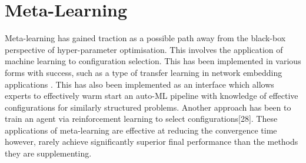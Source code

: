 \documentclass{article}
\begin{document}



    



\section{Meta-Learning}

	Meta-learning has gained traction as a possible path away from the black-box perspective of hyper-parameter optimisation. This involves the application of machine learning to configuration selection. This has been implemented in various forms with success, such as a type of transfer learning in network embedding applications \cite{9}. This has also been implemented as an interface which allows experts to effectively warm start an auto-ML pipeline with knowledge of effective configurations for similarly structured problems\cite{29}. Another approach has been to train an agent via reinforcement learning to select configurations[28]. These applications of meta-learning are effective at reducing the convergence time however, rarely achieve significantly superior final performance than the methods they are supplementing.\cite{31}\cite{29}



\newpage
\printbibliography
\end{document}
